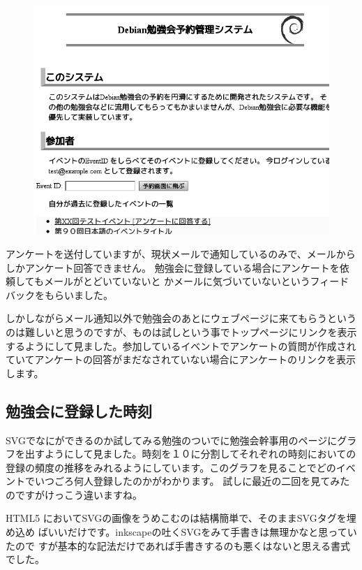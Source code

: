 \documentclass[mingoth,a4paper]{jsarticle}
\begin{document}
\begin{figure}
\includegraphics[width=1\hsize]{image201304/enquetereminder_mono.png}
\end{figure}

アンケートを送付していますが、現状メールで通知しているのみで、メールから
しかアンケート回答できません。
勉強会に登録している場合にアンケートを依頼してもメールがとどいていないと
かメールに気づいていないというフィードバックをもらいました。

しかしながらメール通知以外で勉強会のあとにウェブページに来てもらうという
のは難しいと思うのですが、ものは試しという事でトップページにリンクを表示
するようにして見ました。参加しているイベントでアンケートの質問が作成され
ていてアンケートの回答がまだなされていない場合にアンケートのリンクを表示
します。


\subsection{勉強会に登録した時刻}

SVGでなにができるのか試してみる勉強のついでに勉強会幹事用のページにグラ
フを出すようにして見ました。時刻を１０に分割してそれぞれの時刻においての
登録の頻度の推移をみれるようにしています。このグラフを見ることでどのイベ
ントでいつごろ何人登録したのかがわかります。
試しに最近の二回を見てみたのですがけっこう違いますね。

HTML5 においてSVGの画像をうめこむのは結構簡単で、そのままSVGタグを埋め込め
ばいいだけです。inkscapeの吐くSVGをみて手書きは無理かなと思っていたので
すが基本的な記法だけであれば手書きするのも悪くはないと思える書式でした。
\end{document}
